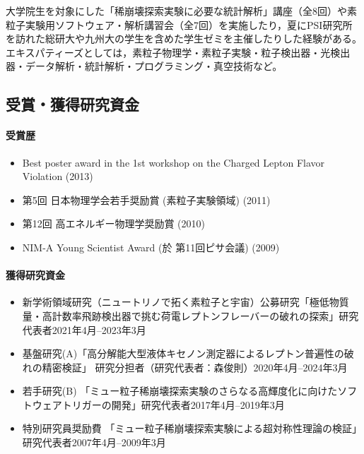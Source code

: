 \documentclass[11pt,a4paper,uplatex,dvipdfmx]{ujarticle} 		%
\newcommand{\研究課題名}{象の卵}
\newcommand{\研究機関名}{東京大学}
\newcommand{\研究代表者氏名}{内山雄祐}
\newcommand{\研究期間の最終元号年度}{6}  %
\begin{document}
大学院生を対象にした「稀崩壊探索実験に必要な統計解析」講座（全8回）や素粒子実験用ソフトウェア・解析講習会（全7回）を実施したり，夏にPSI研究所を訪れた総研大や九州大の学生を含めた学生ゼミを主催したりした経験がある。エキスパティーズとしては，素粒子物理学・素粒子実験・粒子検出器・光検出器・データ解析・統計解析・プログラミング・真空技術など。


\subsection{受賞・獲得研究資金}
\paragraph{受賞歴}
\begin{itemize}
  \setlength{\parskip}{0cm} %
  \setlength{\itemsep}{0cm} %
\item Best poster award in the 1st workshop on the Charged Lepton Flavor Violation (2013) \cite{rmd1}
\item 第5回 日本物理学会若手奨励賞 (素粒子実験領域) (2011)
\item 第12回 高エネルギー物理学奨励賞 (2010)
\item NIM-A Young Scientist Award (於 第11回ピサ会議) (2009) \cite{gamma_rec}
\end{itemize}

\paragraph{獲得研究資金}
\begin{itemize}
  \setlength{\parskip}{0cm} %
  \setlength{\itemsep}{0cm} %
\item 新学術領域研究（ニュートリノで拓く素粒子と宇宙）公募研究「極低物質量・高計数率飛跡検出器で挑む荷電レプトンフレーバーの破れの探索」研究代表者2021年4月--2023年3月
\item 基盤研究(A)「高分解能大型液体キセノン測定器によるレプトン普遍性の破れの精密検証」
研究分担者（研究代表者：森俊則）2020年4月--2024年3月
\item 若手研究(B) 「ミュー粒子稀崩壊探索実験のさらなる高輝度化に向けたソフトウェアトリガーの開発」研究代表者2017年4月--2019年3月
\item 特別研究員奨励費 「ミュー粒子稀崩壊探索実験による超対称性理論の検証」研究代表者2007年4月--2009年3月
\end{itemize}

\newpage




\end{document}
